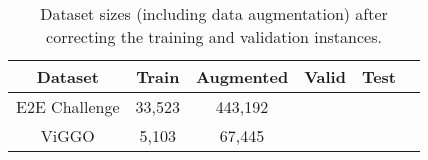 \begin{table}
\centering
\begin{tabular}{cc cccc}
\toprule
Dataset & Train & Augmented & Valid & Test \\
\midrule
E2E Challenge & 33,523 & 443,192 & & \\
ViGGO         &  5,103 &  67,445 &  & \\
\bottomrule
\end{tabular}
\caption{Dataset sizes (including data augmentation) after correcting
the training and validation instances.}
\label{tab:cgdata}
\end{table}
